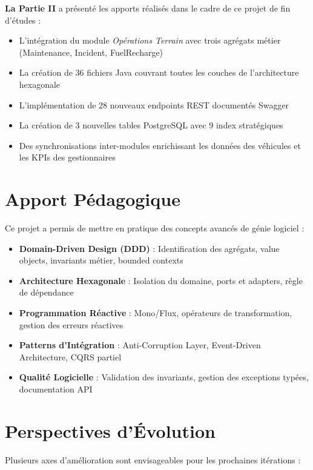 \documentclass[12pt,a4paper]{report}
\begin{document}
\textbf{La Partie II} a présenté les apports réalisés dans le cadre de ce projet de fin d'études :
\begin{itemize}[leftmargin=2cm]
  \item L'intégration du module \textit{Opérations Terrain} avec trois agrégats métier (Maintenance, Incident, FuelRecharge)
  \item La création de 36 fichiers Java couvrant toutes les couches de l'architecture hexagonale
  \item L'implémentation de 28 nouveaux endpoints REST documentés Swagger
  \item La création de 3 nouvelles tables PostgreSQL avec 9 index stratégiques
  \item Des synchronisations inter-modules enrichissant les données des véhicules et les KPIs des gestionnaires
\end{itemize}

\section*{Apport Pédagogique}

Ce projet a permis de mettre en pratique des concepts avancés de génie logiciel :

\begin{itemize}[leftmargin=2cm]
  \item \textbf{Domain-Driven Design (DDD)} : Identification des agrégats, value objects, invariants métier, bounded contexts
  \item \textbf{Architecture Hexagonale} : Isolation du domaine, ports et adapters, règle de dépendance
  \item \textbf{Programmation Réactive} : Mono/Flux, opérateurs de transformation, gestion des erreurs réactives
  \item \textbf{Patterns d'Intégration} : Anti-Corruption Layer, Event-Driven Architecture, CQRS partiel
  \item \textbf{Qualité Logicielle} : Validation des invariants, gestion des exceptions typées, documentation API
\end{itemize}

\section*{Perspectives d'Évolution}

Plusieurs axes d'amélioration sont envisageables pour les prochaines itérations :
\end{document}
